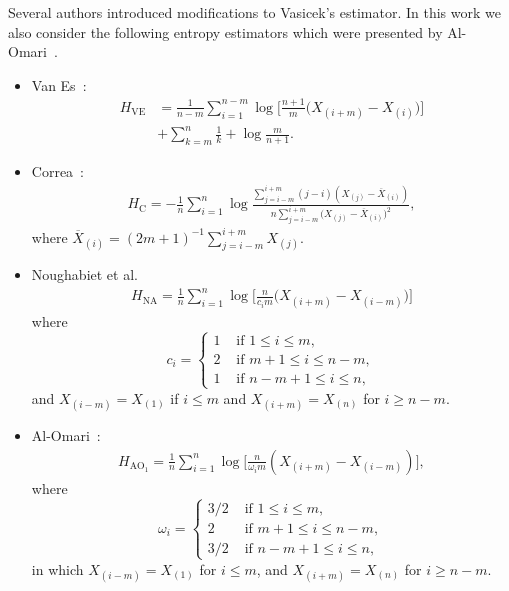 \documentclass[journal]{IEEEtran}
\begin{document}
Several authors introduced modifications to Vasicek's estimator. 
In this work we also consider the following entropy estimators which were presented by Al-Omari~\cite{AlOmari2016}. 
\begin{itemize}
	\item Van Es~\cite{VanEs92}:
	\begin{align}
		\label{HVE}
		H_\text{VE}&=\frac{1}{n-m} \sum_{i=1}^{n-m}\log{\Big[\frac{n+1}{m}\big(X_{(i+m)}-X_{(i)}\big)\Big]} \nonumber\\
		&+\sum_{k=m}^{n} \frac{1}{k}+\log \frac{m}{n+1}.
	\end{align}
	\item Correa~\cite{Correa95}:
	\begin{align}
		\label{HC}
		H_\text{C}=-\frac{1}{n} \sum_{i=1}^{n} \log \frac{\sum_{j=i-m}^{i+m}(j-i)\left(X_{(j)}-\overline{X}_{(i)}\right)}{n \sum_{j=i-m}^{i+m}\big(X_{(j)}-\overline{X}_{(i)}\big)^{2}},
	\end{align}
	where $\overline{X}_{(i)}=(2 m+1)^{-1} \sum_{j=i-m}^{i+m} X_{(j)}$.
	\item Noughabiet et al.~\cite{Noughabi2010} 
	\label{HNA}
	\begin{align}
		H_\text{NA}=\frac{1}{n} \sum_{i=1}^{n} \log \Big[\frac{n}{c_{i} m}\big(X_{(i+m)}-X_{(i-m)}\big)\Big]
	\end{align}
	where 
	\begin{equation*}
		c_{i}=\left\{\begin{array}{ll}
			1 & \text{ if }1 \leq i \leq m, \\
			2 & \text{ if }m+1 \leq i \leq n-m, \\
			1 & \text{ if }n-m+1 \leq i \leq n,
		\end{array}\right.
	\end{equation*}
	and $X_{(i-m)}=X_{(1)}$ if $i \leq m$ and $X_{(i+m)}=X_{(n)}$ for $i \geq n-m $. 
	\item Al-Omari~\cite{AlOmari2014}:
	\begin{align}
		H_{{\text{AO}}_1}=\frac{1}{n} \sum_{i=1}^{n} \log \Big[\frac{n}{\omega_{i} m}\left(X_{(i+m)}-X_{(i-m)}\right)\Big], 
		\label{AHE}
	\end{align}
	where
	\begin{equation*}
		\omega_{i}= \begin{cases}
			3/2 & \text{ if }1 \leq i \leq m, \\
			2 & \text{ if } m+1 \leq i \leq n-m, \\
			3/2 & \text{ if } n-m+1 \leq i \leq n,
		\end{cases}
	\end{equation*}
	in which $X_{(i-m)}=X_{(1)}$ for $i \leq m$, and $X_{(i+m)}=X_{(n)}$ for $i \geq n-m$. 
	

\end{itemize}
\end{document}
